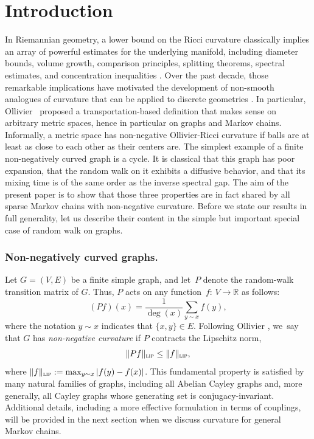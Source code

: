 \documentclass[JEP,XML,SOM,Unicode,NoEqCountersInSection,published]{cedram}
\theoremstyle{definition}
\newcommand{\dR}{\mathbb {R}}
\newcommand{\lip}{\textup{\textsc{lip}}}
\begin{document}
\section{Introduction}
In Riemannian geometry, a lower bound on the Ricci curvature classically implies an array of powerful estimates for the underlying manifold, including diameter bounds, volume growth, comparison principles, splitting theorems, spectral estimates, and concentration inequalities \cite{jost2017a}. Over the past decade, those remarkable implications have motivated the development of non-smooth analogues of curvature that can be applied to discrete geometries
\cite{schmuckenschlager1998curvature,lin2010ricci,
forman2003bochner,erbar2012ricci,ollivier2009ricci,
jost2021characterizations,najman2017modern, munch2017ollivier}.
In particular, \hbox{Ollivier}~\cite{ollivier2009ricci} proposed a transportation-based definition that makes sense on arbitrary metric spaces, hence in particular on graphs and Markov chains.
Informally, a metric space has non-negative Ollivier-Ricci curvature if balls are at least as close to each other as their centers are. The simplest example of a finite non-negatively curved graph is a cycle. It is classical that this graph has poor expansion, that the random walk on it exhibits a diffusive behavior, and that its mixing time is of the same order as the inverse spectral gap. The aim of the present paper is to show that those three properties are in fact shared by all sparse Markov chains with non-negative curvature. Before we state our results in full generality, let us describe their content in the simple but important special case of random walk on graphs.

\subsubsection*{Non-negatively curved graphs.}Let $G=(V,E)$ be a finite simple graph, and let~$P$ denote the random-walk transition matrix of $G$. Thus, $P$ acts on any \hbox{function $f{:}\, V\!\to\!\dR$} as follows:
\begin{equation*}
(Pf)(x) = \frac{1}{\deg(x)}\sum_{y\sim x}f(y),
\end{equation*}
where the notation $y\sim x$ indicates that $\{x,y\}\in E$. Following Ollivier \cite{ollivier2009ricci,ollivier2010survey}, we~say that $G$ has \emph{non-negative curvature} if $P$ contracts the Lipschitz norm, \ie
\begin{equation*}
\|Pf\|_{\lip} \le \|f\|_{\lip},
\end{equation*}
where $\|f\|_{\lip}:=\max_{y\sim x }{|f(y)-f(x)|}$.
This fundamental property is satisfied by many natural families of graphs, including all Abelian Cayley graphs and, more generally, all Cayley graphs whose generating set is conjugacy-invariant.
Additional details, including a more effective formulation in terms of couplings, will be provided in the next section when we discuss curvature for general Markov chains.
\end{document}
